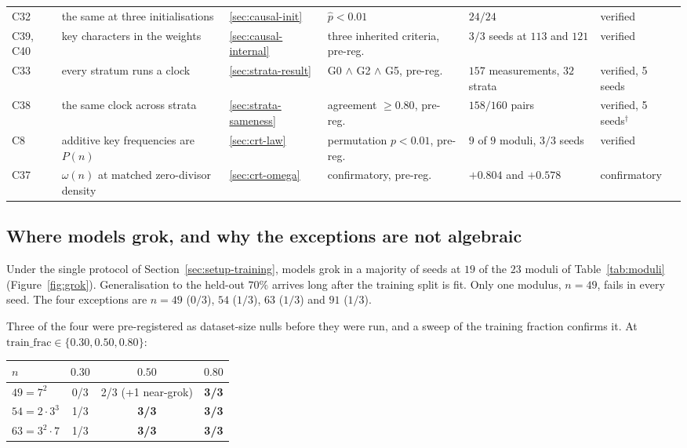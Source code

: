 \begin{table}[t]
\begin{tabular}{l p{} l p{} p{} l}
    C32 & the same at three initialisations & \ref{sec:causal-init} & $\hat{p} < 0.01$ & $24/24$ & verified \\
    C39, C40 & key characters in the weights & \ref{sec:causal-internal} & three inherited criteria, pre-reg. & $3/3$ seeds at $113$ and $121$ & verified \\
    C33 & every stratum runs a clock & \ref{sec:strata-result} & G0 $\wedge$ G2 $\wedge$ G5, pre-reg. & $157$ measurements, $32$ strata & verified, 5 seeds \\
    C38 & the same clock across strata & \ref{sec:strata-sameness} & agreement $\ge 0.80$, pre-reg. & $158/160$ pairs & verified, 5 seeds$^{\dagger}$ \\
    C8 & additive key frequencies are $P(n)$ & \ref{sec:crt-law} & permutation $p < 0.01$, pre-reg. & $9$ of $9$ moduli, $3/3$ seeds & verified \\
    C37 & $\omega(n)$ at matched zero-divisor density & \ref{sec:crt-omega} & confirmatory, pre-reg. & $+0.804$ and $+0.578$ & confirmatory \\
    \bottomrule
  \end{tabular}
\end{table}

\subsection{Where models grok, and why the exceptions are not algebraic}
\label{sec:clock-grok}

Under the single protocol of Section~\ref{sec:setup-training}, models grok in a majority of
seeds at $19$ of the $23$ moduli of Table~\ref{tab:moduli} (Figure~\ref{fig:grok}).
Generalisation to the held-out $70\%$ arrives long after the training split is fit. Only one modulus, $n = 49$, fails in
every seed. The four exceptions are $n = 49$ ($0/3$), $54$ ($1/3$), $63$ ($1/3$) and $91$
($1/3$).

Three of the four were pre-registered as dataset-size nulls before they were run, and a sweep
of the training fraction confirms it. At $\mathrm{train\_frac} \in \{0.30, 0.50, 0.80\}$:

\begin{center}
\begin{tabular}{lccc}
  \toprule
  $n$ & $0.30$ & $0.50$ & $0.80$ \\
  \midrule
  $49 = 7^{2}$ & 0/3 & 2/3 (+1 near-grok) & \textbf{3/3} \\
  $54 = 2 \cdot 3^{3}$ & 1/3 & \textbf{3/3} & \textbf{3/3} \\
  $63 = 3^{2} \cdot 7$ & 1/3 & \textbf{3/3} & \textbf{3/3} \\
  \bottomrule
\end{tabular}
\end{center}


